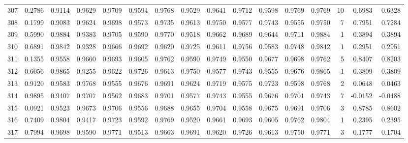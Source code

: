 \begin{tabular}{lrrrrrrrrrrrrrrr}
307 &      0.2786 &  0.9114 &  0.9629 &  0.9709 &  0.9594 &  0.9768 &  0.9529 &  0.9641 &  0.9712 &  0.9598 &   0.9769 &     0.9769 &     10 &                    0.6983 &                     0.6328 \\
308 &      0.1799 &  0.9083 &  0.9624 &  0.9698 &  0.9573 &  0.9735 &  0.9613 &  0.9750 &  0.9577 &  0.9743 &   0.9555 &     0.9750 &      7 &                    0.7951 &                     0.7284 \\
309 &      0.5990 &  0.9884 &  0.9383 &  0.9705 &  0.9590 &  0.9770 &  0.9518 &  0.9662 &  0.9689 &  0.9644 &   0.9711 &     0.9884 &      1 &                    0.3894 &                     0.3894 \\
310 &      0.6891 &  0.9842 &  0.9328 &  0.9666 &  0.9692 &  0.9620 &  0.9725 &  0.9611 &  0.9756 &  0.9583 &   0.9748 &     0.9842 &      1 &                    0.2951 &                     0.2951 \\
311 &      0.1355 &  0.9558 &  0.9660 &  0.9693 &  0.9605 &  0.9762 &  0.9590 &  0.9749 &  0.9550 &  0.9677 &   0.9698 &     0.9762 &      5 &                    0.8407 &                     0.8203 \\
312 &      0.6056 &  0.9865 &  0.9255 &  0.9622 &  0.9726 &  0.9613 &  0.9750 &  0.9577 &  0.9743 &  0.9555 &   0.9676 &     0.9865 &      1 &                    0.3809 &                     0.3809 \\
313 &      0.9120 &  0.9583 &  0.9768 &  0.9555 &  0.9676 &  0.9691 &  0.9624 &  0.9719 &  0.9575 &  0.9723 &   0.9598 &     0.9768 &      2 &                    0.0648 &                     0.0463 \\
314 &      0.9895 &  0.9407 &  0.9707 &  0.9562 &  0.9683 &  0.9701 &  0.9577 &  0.9743 &  0.9555 &  0.9676 &   0.9701 &     0.9743 &      7 &                   -0.0152 &                    -0.0488 \\
315 &      0.0921 &  0.9523 &  0.9673 &  0.9706 &  0.9556 &  0.9688 &  0.9655 &  0.9704 &  0.9558 &  0.9675 &   0.9691 &     0.9706 &      3 &                    0.8785 &                     0.8602 \\
316 &      0.7409 &  0.9804 &  0.9417 &  0.9723 &  0.9592 &  0.9769 &  0.9520 &  0.9661 &  0.9693 &  0.9605 &   0.9762 &     0.9804 &      1 &                    0.2395 &                     0.2395 \\
317 &      0.7994 &  0.9698 &  0.9590 &  0.9771 &  0.9513 &  0.9663 &  0.9691 &  0.9620 &  0.9726 &  0.9613 &   0.9750 &     0.9771 &      3 &                    0.1777 &                     0.1704 \\

\end{tabular}
